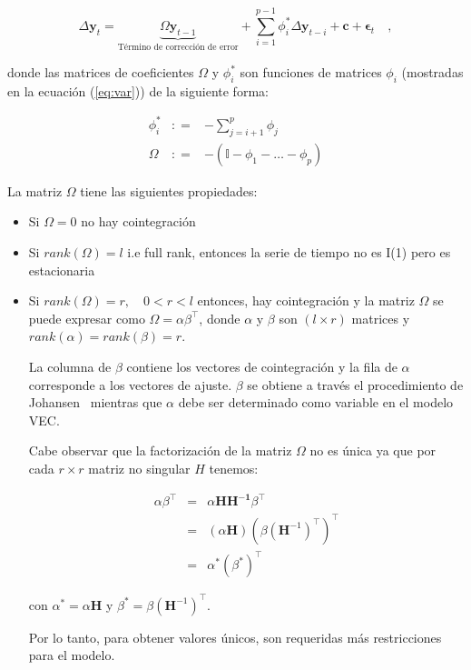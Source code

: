\begin{equation}
 \label{eq:vec}
  \Delta \mathbf{y}_t = 
   \underbrace{ \Omega\mathbf{y}_{t-1}}_\text{Término de corrección de error} + 
    \sum_{i=1}^{p-1}
    \phi_i^* \Delta \mathbf{y}_{t-i}  + \mathbf{c} + \mathbf{\epsilon}_t \quad ,
    \end{equation}

    \noindent donde las matrices de coeficientes $\Omega$ y $\phi_i^*$ son
    funciones de matrices $\phi_i$ (mostradas en la ecuación (\ref{eq:var})) de
    la siguiente forma:

    \begin{eqnarray*}
    \phi_i^* &: =& -\sum_{j=i+1}^{p} \phi_j \\
    \Omega &: =& -(\mathbb{I}-\phi_1-\dots-\phi_p) 
    \end{eqnarray*}

    La matriz $\Omega$ tiene las siguientes propiedades:
    \begin{itemize}
    \item Si $\Omega = 0$ no hay cointegración 
    \item Si $rank(\Omega)=l$ i.e full rank, entonces la serie de tiempo no es I(1) pero es estacionaria
    \item Si $rank(\Omega)=r,\quad 0 < r < l$ entonces, hay cointegración 
    y la matriz $\Omega$ se puede expresar como $\Omega =
    \alpha \beta^\intercal$, donde $\alpha$ y $\beta$ son $(l \times r)$
    matrices y $rank(\alpha)=rank(\beta)=r$.

    La columna de $\beta$ contiene los vectores de cointegración y la fila de
    $\alpha$ corresponde a los vectores de ajuste. $\beta$ se obtiene a través
    el procedimiento de Johansen~\cite{johansen1988} mientras que $\alpha$ debe
    ser determinado como variable en el modelo VEC.

    Cabe observar que la factorización de la matriz $\Omega$ no es única ya que por cada
    $r \times r$ matriz no singular $H$ tenemos:

\begin{eqnarray*}
\alpha \beta^\intercal &=& \alpha \mathbf{HH^{-1}} \beta^\intercal\\
&=&(\alpha\mathbf{H})(\beta(\mathbf{H}^{-1})^\intercal)^\intercal \\
&=& \alpha^*(\beta^*)^\intercal
\end{eqnarray*}

\noindent con $\alpha^* = \alpha\mathbf{H}$ y $\beta^* =
\beta(\mathbf{H}^{-1})^\intercal$.

Por lo tanto, para obtener valores únicos, son requeridas más restricciones
para el modelo.

\end{itemize}


